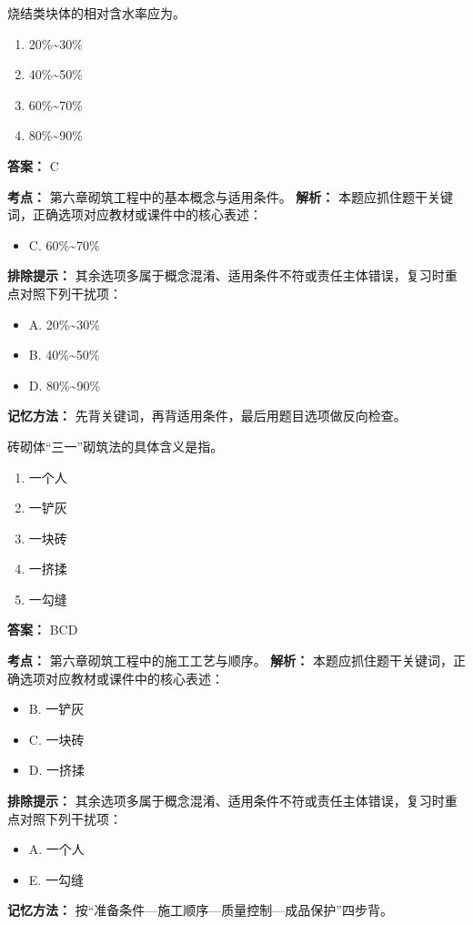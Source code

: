\documentclass[UTF8,fontset=fandol,11pt]{ctexart}
\begin{document}
\begin{quizbox}[title={第 11 题}]
烧结类块体的相对含水率应为。\\
\begin{enumerate}[label=\Alph*.]
\item 20\%\textasciitilde{}30\%
\item 40\%\textasciitilde{}50\%
\item 60\%\textasciitilde{}70\%
\item 80\%\textasciitilde{}90\%
\end{enumerate}
\textbf{答案：} C
\vspace{0.25em}
\begin{answerbox}[title={考点解析}]
\textbf{考点：} 第六章砌筑工程中的基本概念与适用条件。
\textbf{解析：} 本题应抓住题干关键词，正确选项对应教材或课件中的核心表述：
\begin{itemize}
\item C. 60\%\textasciitilde{}70\%
\end{itemize}
\textbf{排除提示：} 其余选项多属于概念混淆、适用条件不符或责任主体错误，复习时重点对照下列干扰项：
\begin{itemize}
\item A. 20\%\textasciitilde{}30\%
\item B. 40\%\textasciitilde{}50\%
\item D. 80\%\textasciitilde{}90\%
\end{itemize}
\textbf{记忆方法：} 先背关键词，再背适用条件，最后用题目选项做反向检查。
\end{answerbox}
\end{quizbox}

\begin{quizbox}[title={第 12 题}]
砖砌体“三一”砌筑法的具体含义是指。\\
\begin{enumerate}[label=\Alph*.]
\item 一个人
\item 一铲灰
\item 一块砖
\item 一挤揉
\item 一勾缝
\end{enumerate}
\textbf{答案：} BCD
\vspace{0.25em}
\begin{answerbox}[title={考点解析}]
\textbf{考点：} 第六章砌筑工程中的施工工艺与顺序。
\textbf{解析：} 本题应抓住题干关键词，正确选项对应教材或课件中的核心表述：
\begin{itemize}
\item B. 一铲灰
\item C. 一块砖
\item D. 一挤揉
\end{itemize}
\textbf{排除提示：} 其余选项多属于概念混淆、适用条件不符或责任主体错误，复习时重点对照下列干扰项：
\begin{itemize}
\item A. 一个人
\item E. 一勾缝
\end{itemize}
\textbf{记忆方法：} 按“准备条件—施工顺序—质量控制—成品保护”四步背。
\end{answerbox}
\end{quizbox}
\end{document}

